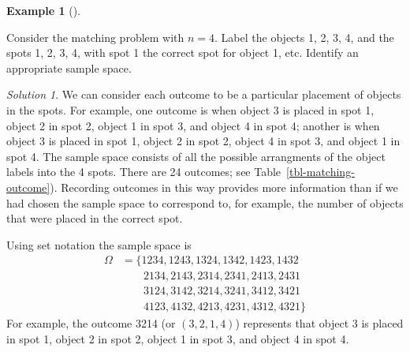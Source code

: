 \documentclass[
  letterpaper,
  DIV=11,
  numbers=noendperiod]{scrreprt}
\theoremstyle{plain}
\theoremstyle{definition}
\newtheorem{example}{Example}[chapter]
\theoremstyle{definition}
\theoremstyle{definition}
\theoremstyle{remark}
\newtheorem{refsolution}{Solution}[chapter]
\begin{document}
\begin{tcolorbox}[enhanced jigsaw, opacityback=0, left=2mm, colframe=quarto-callout-note-color-frame, toprule=.15mm, breakable, colback=white, leftrule=.75mm, arc=.35mm, rightrule=.15mm, bottomrule=.15mm]

\begin{example}[]\protect\hypertarget{exm-matching-outcome}{}\label{exm-matching-outcome}

Consider the matching problem with \(n=4\). Label the objects 1, 2, 3,
4, and the spots 1, 2, 3, 4, with spot 1 the correct spot for object 1,
etc. Identify an appropriate sample space.

\end{example}

\end{tcolorbox}

\begin{tcolorbox}[enhanced jigsaw, opacityback=0, rightrule=.15mm, coltitle=black, colframe=quarto-callout-tip-color-frame, toprule=.15mm, colbacktitle=quarto-callout-tip-color!10!white, opacitybacktitle=0.6, left=2mm, toptitle=1mm, breakable, title={Solution (click to expand)}, bottomtitle=1mm, colback=white, leftrule=.75mm, titlerule=0mm, arc=.35mm, bottomrule=.15mm]

\begin{refsolution}
We can consider each outcome to be a particular placement of objects in
the spots. For example, one outcome is when object 3 is placed in spot
1, object 2 in spot 2, object 1 in spot 3, and object 4 in spot 4;
another is when object 3 is placed in spot 1, object 2 in spot 2, object
4 in spot 3, and object 1 in spot 4. The sample space consists of all
the possible arrangments of the object labels into the 4 spots. There
are 24 outcomes; see Table~\ref{tbl-matching-outcome}). Recording
outcomes in this way provides more information than if we had chosen the
sample space to correspond to, for example, the number of objects that
were placed in the correct spot.

Using set notation the sample space is \begin{align*}
\Omega & = \{1234, 1243, 1324, 1342, 1423, 1432 \\
  & \qquad 2134, 2143, 2314, 2341, 2413, 2431 \\
  & \qquad 3124, 3142, 3214, 3241, 3412, 3421 \\
  & \qquad 4123, 4132, 4213, 4231, 4312, 4321\}
\end{align*} For example, the outcome 3214 (or \((3, 2, 1, 4)\))
represents that object 3 is placed in spot 1, object 2 in spot 2, object
1 in spot 3, and object 4 in spot 4.

\label{sol-matching-outcome}

\end{refsolution}

\end{tcolorbox}
\end{document}

